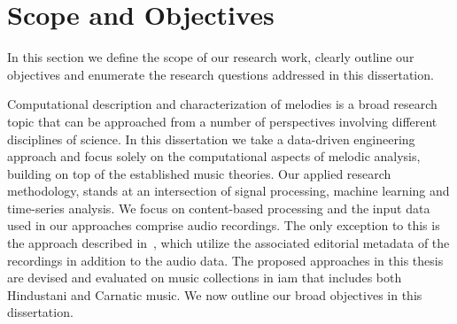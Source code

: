 %
%

\section{Scope and Objectives}
\label{sec:intro_scope_context_relevance}

In this section we define the scope of our research work, clearly outline our objectives and enumerate the research questions addressed in this dissertation. 

Computational description and characterization of melodies is a broad research topic that can be approached from a number of perspectives involving different disciplines of science. In this dissertation we take a data-driven engineering approach and focus solely on the computational aspects of melodic analysis, building on top of the established music theories. Our applied research methodology, stands at an intersection of signal processing, machine learning and time-series analysis. We focus on content-based processing and the input data used in our approaches comprise audio recordings. The only exception to this is the approach described in~, which utilize the associated editorial metadata of the recordings in addition to the audio data. The proposed approaches in this thesis are devised and evaluated on music collections in \gls{iam} that includes both Hindustani and Carnatic music. We now outline our broad objectives in this dissertation.

